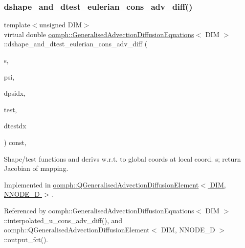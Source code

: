 \subsubsection{\texorpdfstring{dshape\+\_\+and\+\_\+dtest\+\_\+eulerian\+\_\+cons\+\_\+adv\+\_\+diff()}{dshape\_and\_dtest\_eulerian\_cons\_adv\_diff()}}
{\footnotesize\ttfamily template$<$unsigned D\+IM$>$ \\
virtual double \hyperlink{classoomph_1_1GeneralisedAdvectionDiffusionEquations}{oomph\+::\+Generalised\+Advection\+Diffusion\+Equations}$<$ D\+IM $>$\+::dshape\+\_\+and\+\_\+dtest\+\_\+eulerian\+\_\+cons\+\_\+adv\+\_\+diff (\begin{DoxyParamCaption}\item[{const \hyperlink{classoomph_1_1Vector}{Vector}$<$ double $>$ \&}]{s,  }\item[{\hyperlink{classoomph_1_1Shape}{Shape} \&}]{psi,  }\item[{\hyperlink{classoomph_1_1DShape}{D\+Shape} \&}]{dpsidx,  }\item[{\hyperlink{classoomph_1_1Shape}{Shape} \&}]{test,  }\item[{\hyperlink{classoomph_1_1DShape}{D\+Shape} \&}]{dtestdx }\end{DoxyParamCaption}) const\hspace{0.3cm}{\ttfamily [protected]}, {}}



Shape/test functions and derivs w.\+r.\+t. to global coords at local coord. s; return Jacobian of mapping. 



Implemented in \hyperlink{classoomph_1_1QGeneralisedAdvectionDiffusionElement_ac3743f95fd8a381bb86b2a1fd08673f4}{oomph\+::\+Q\+Generalised\+Advection\+Diffusion\+Element$<$ D\+I\+M, N\+N\+O\+D\+E\+\_\+D $>$}.



Referenced by oomph\+::\+Generalised\+Advection\+Diffusion\+Equations$<$ D\+I\+M $>$\+::interpolated\+\_\+u\+\_\+cons\+\_\+adv\+\_\+diff(), and oomph\+::\+Q\+Generalised\+Advection\+Diffusion\+Element$<$ D\+I\+M, N\+N\+O\+D\+E\+\_\+D $>$\+::output\+\_\+fct().

\mbox{\label{classoomph_1_1GeneralisedAdvectionDiffusionEquations_a7341d08424050525cfe3430001c1dced}} 
